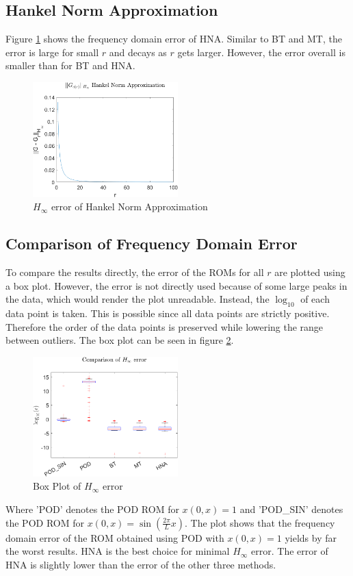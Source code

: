 \subsection{Hankel Norm Approximation}
Figure \ref{FIG-H-HNA} shows the frequency domain error of HNA.
Similar to BT and MT, the error is large for small \(r\) and decays as \(r\) gets larger.
However, the error overall is smaller than for BT and HNA.
\begin{figure}[H]
\centering
\includegraphics[width=0.5\textwidth]{images/freq/H_HNA}
\caption{$H_{\infty}$ error of Hankel Norm Approximation}
\label{FIG-H-HNA}
\end{figure}

\subsection{Comparison of Frequency Domain Error}
To compare the results directly, the error of the ROMs for all \(r\) are plotted using a box plot.
However, the error is not directly used because of some large peaks in the data, which would render the plot unreadable.
Instead, the \(\log_{10}\) of each data point is taken.
This is possible since all data points are strictly positive. Therefore the order of the data points is preserved while lowering the range between outliers.
The box plot can be seen in figure \ref{FIG-H-BOX}.
\begin{figure}[H]
\centering
\includegraphics[width=0.5\textwidth]{images/freq/H_BOX}
\caption{Box Plot of $H_{\infty}$ error}
\label{FIG-H-BOX}
\end{figure}
Where 'POD' denotes the POD ROM for \(x(0, x) = 1\) and 'POD\_SIN' denotes the POD ROM for \(x(0, x) =  \sin(\frac{2\pi}{L}x)\).
The plot shows that the frequency domain error of the ROM obtained using POD with \(x(0, x) = 1\) yields by far the worst results.
HNA is the best choice for minimal \(H_{\infty}\) error. 
The error of HNA is slightly lower than the error of the other three methods.

